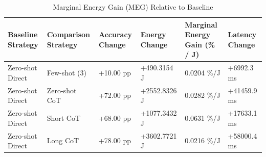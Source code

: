 \begin{table}
\caption{Marginal Energy Gain (MEG) Relative to Baseline}
\label{tab:marginal_energy_gain}
\begin{tabular}{llllll}
\toprule
Baseline Strategy & Comparison Strategy & Accuracy Change & Energy Change & Marginal Energy Gain (\% / J) & Latency Change \\
\midrule
Zero-shot Direct & Few-shot (3) & +10.00 pp & +490.3154 J & 0.0204 \%/J & +6992.3 ms \\
Zero-shot Direct & Zero-shot CoT & +72.00 pp & +2552.8326 J & 0.0282 \%/J & +41459.9 ms \\
Zero-shot Direct & Short CoT & +68.00 pp & +1077.3432 J & 0.0631 \%/J & +17633.1 ms \\
Zero-shot Direct & Long CoT & +78.00 pp & +3602.7721 J & 0.0216 \%/J & +58000.4 ms \\
\bottomrule
\end{tabular}
\end{table}
